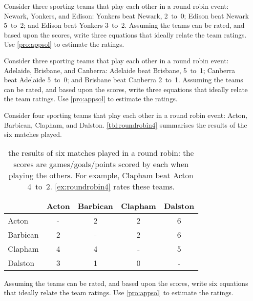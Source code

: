 
\begin{exercise} \label{ex:} 
Consider three sporting teams that play each other in a round robin  event: Newark, Yonkers, and Edison:
Yonkers beat Newark, 2~to~0;
Edison beat Newark 5~to~2; and
Edison beat Yonkers 3~to~2.
Assuming the teams can be rated, and  based upon the scores, write three equations that ideally relate the team ratings.  
Use \autoref{pro:appsol} to estimate the ratings.
\end{exercise}



\begin{exercise} \label{ex:} 
Consider three sporting teams that play each other in a round robin  event: Adelaide, Brisbane, and Canberra:
Adelaide beat Brisbane, 5~to~1;
Canberra beat Adelaide 5~to~0; and
Brisbane beat Canberra 2~to~1.
Assuming the teams can be rated, and  based upon the scores, write three equations that ideally relate the team ratings.  
Use \autoref{pro:appsol} to estimate the ratings.
\end{exercise}



\begin{exercise} \label{ex:roundrobin4} 
Consider four sporting teams that play each other in a round robin  event: Acton, Barbican, Clapham, and Dalston.
\autoref{tbl:roundrobin4} summarises the results of the six matches played.
\begin{table}
\caption{the results of six matches played in a round robin: the scores are games\slash goals\slash points scored by each when playing the others.  For example, Clapham beat Acton 4~to~2. \autoref{ex:roundrobin4} rates these teams.}
\label{tbl:roundrobin4}
\begin{center}
\begin{tabular}{l|cccc} \hline
&Acton& Barbican& Clapham& Dalston\\ \hline
Acton & - & 2 & 2 & 6 \\
Barbican & 2 & - & 2 & 6 \\
Clapham & 4 & 4 & - & 5 \\
Dalston & 3 & 1 & 0 & - \\ \hline
\end{tabular}
\end{center}
\end{table}%
Assuming the teams can be rated, and  based upon the scores, write six equations that ideally relate the team ratings.  
Use \autoref{pro:appsol} to estimate the ratings.
\end{exercise}



